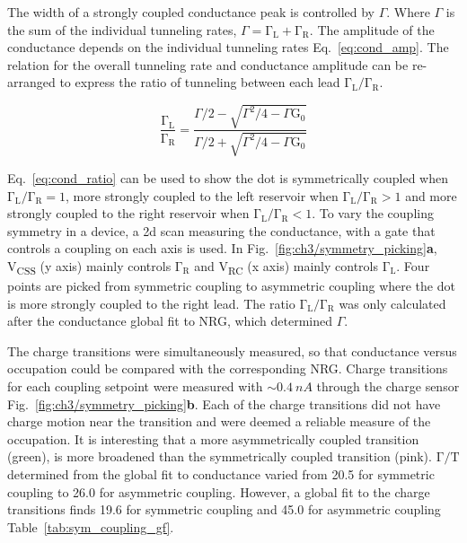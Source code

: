 The width of a strongly coupled conductance peak is controlled by $\Gamma$. Where $\Gamma$ is the sum of the individual tunneling rates, $\Gamma=\mathrm{\Gamma_L} + \mathrm{\Gamma_R}$. The amplitude of the conductance depends on the individual tunneling rates Eq.~\ref{eq:cond_amp}. The relation for the overall tunneling rate and conductance amplitude can be re-arranged to express the ratio of tunneling between each lead $\mathrm{\Gamma_L}/\mathrm{\Gamma_R}$.



\begin{equation}\label{eq:cond_ratio}
 \frac{\mathrm{\Gamma_L}}{\mathrm{\Gamma_R}} = 
 \frac
 {\Gamma/2 - \sqrt{\Gamma^2/4 - \Gamma\mathrm{G_0}}}
 {\Gamma/2 + \sqrt{\Gamma^2/4 - \Gamma\mathrm{G_0}}}
\end{equation}


Eq.~\ref{eq:cond_ratio} can be used to show the dot is symmetrically coupled when $\mathrm{\Gamma_L}/\mathrm{\Gamma_R} = 1$, more strongly coupled to the left reservoir when $\mathrm{\Gamma_L}/\mathrm{\Gamma_R} > 1$ and more strongly coupled to the right reservoir when $\mathrm{\Gamma_L}/\mathrm{\Gamma_R} < 1$. To vary the coupling symmetry in a device, a 2d scan measuring the conductance, with a gate that controls a coupling on each axis is used. In Fig.~\ref{fig:ch3/symmetry_picking}\textbf{a}, V\textsubscript{CSS} (y axis) mainly controls $\mathrm{\Gamma_R}$ and V\textsubscript{RC} (x axis) mainly controls $\mathrm{\Gamma_L}$. Four points are picked from symmetric coupling to asymmetric coupling where the dot is more strongly coupled to the right lead. The ratio $\mathrm{\Gamma_L}/\mathrm{\Gamma_R}$ was only calculated after the conductance global fit to NRG, which determined $\Gamma$. 

The charge transitions were simultaneously measured, so that conductance versus occupation could be compared with the corresponding NRG. Charge transitions for each coupling setpoint were measured with $\sim\qty{0.4}{nA}$ through the charge sensor Fig.~\ref{fig:ch3/symmetry_picking}\textbf{b}. Each of the charge transitions did not have charge motion near the transition and were deemed a reliable measure of the occupation. It is interesting that a more asymmetrically coupled transition (green), is more broadened than the symmetrically coupled transition (pink). $\mathrm{\Gamma/T}$ determined from the global fit to conductance varied from 20.5 for symmetric coupling to 26.0 for asymmetric coupling. However, a global fit to the charge transitions finds 19.6 for symmetric coupling and 45.0 for asymmetric coupling Table~\ref{tab:sym_coupling_gf}. 

